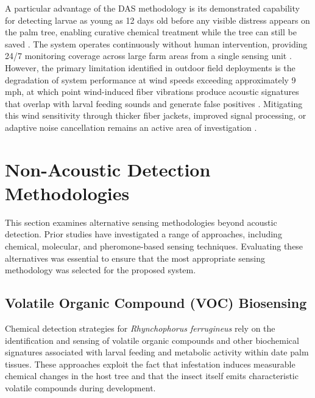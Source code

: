 \documentclass[12pt,a4paper,oneside]{memoir}
\begin{document}
A particular advantage of the DAS methodology is its demonstrated capability for detecting larvae as young as 12 days old before any visible distress appears on the palm tree, enabling curative chemical treatment while the tree can still be saved \cite{ashry2020,ashry2022cnn}. The system operates continuously without human intervention, providing 24/7 monitoring coverage across large farm areas from a single sensing unit \cite{ashry2020}. However, the primary limitation identified in outdoor field deployments is the degradation of system performance at wind speeds exceeding approximately 9 mph, at which point wind-induced fiber vibrations produce acoustic signatures that overlap with larval feeding sounds and generate false positives \cite{ashry2022cnn}. Mitigating this wind sensitivity through thicker fiber jackets, improved signal processing, or adaptive noise cancellation remains an active area of investigation \cite{wang2021}.

\section{Non-Acoustic Detection Methodologies}
\label{sec:GRP-III}

This section examines alternative sensing methodologies beyond acoustic detection. Prior studies have investigated a range of approaches, including chemical, molecular, and pheromone-based sensing techniques. Evaluating these alternatives was essential to ensure that the most appropriate sensing methodology was selected for the proposed system.

\subsection{Volatile Organic Compound (VOC) Biosensing}

Chemical detection strategies for \textit{Rhynchophorus ferrugineus} rely on the identification and sensing of volatile organic compounds and other biochemical signatures associated with larval feeding and metabolic activity within date palm tissues. These approaches exploit the fact that infestation induces measurable chemical changes in the host tree and that the insect itself emits characteristic volatile compounds during development.
\end{document}
